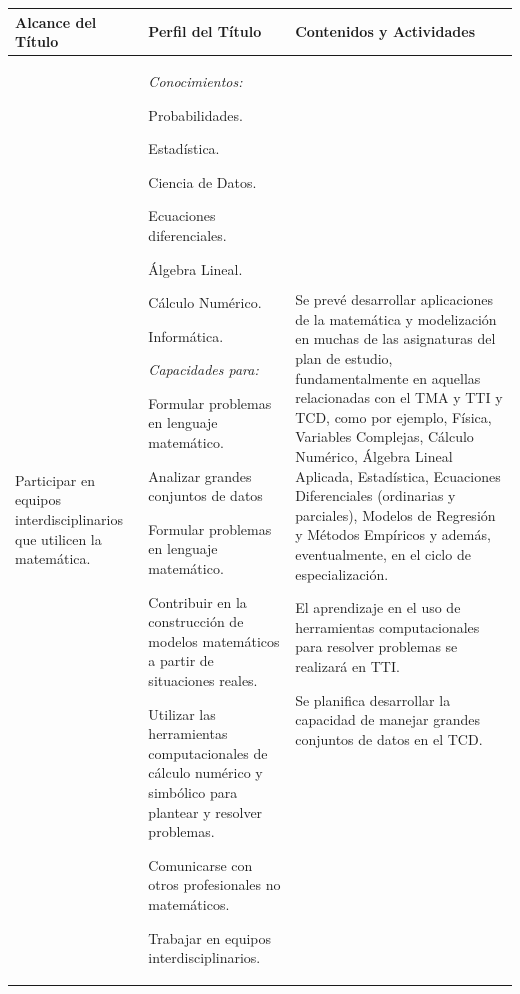 \documentclass[a4paper, 12pt]{article}
\begin{document}
\begin{center}

\begin{tabularx}{1.0\textwidth}{|>{\raggedright\arraybackslash}X |
>{\raggedright\arraybackslash}X |
>{\raggedright\arraybackslash}X |
}\hline
  \rowcolor[gray]{.9}
  Alcance del Título
  & Perfil del Título
  & Contenidos y Actividades \\ \hline
Participar en equipos interdisciplinarios que utilicen la matemática.
  & \emph{Conocimientos:} 
  
 
 Probabilidades.
    
   Estadística.
   
   Ciencia de Datos.
   
   Ecuaciones diferenciales.
   
   Álgebra Lineal. 
   
   Cálculo Numérico. 
   
   Informática.
 
  
  \emph{Capacidades para:} 
    
 
   Formular problemas en lenguaje matemático.
   
    Analizar grandes conjuntos de datos
    
   Formular problemas en lenguaje matemático.
   
   Contribuir en la construcción de modelos matemáticos a partir de situaciones reales.
   
    Utilizar las herramientas computacionales de cálculo numérico y simbólico para plantear y resolver problemas.
    
   Comunicarse con otros profesionales no matemáticos.
   
   Trabajar en equipos interdisciplinarios.
 
  
  
  &

  
 Se prevé desarrollar aplicaciones de la matemática y modelización en muchas de las asignaturas del plan de estudio, fundamentalmente en aquellas relacionadas con el TMA y TTI y TCD, como por ejemplo,  Física, Variables Complejas, Cálculo Numérico, Álgebra Lineal Aplicada, Estadística, Ecuaciones Diferenciales (ordinarias y parciales), Modelos de Regresión y Métodos Empíricos y además, eventualmente, en el ciclo de especialización.
  
  El aprendizaje en el uso de herramientas computacionales para resolver problemas se realizará en  TTI.
  
  Se planifica desarrollar la capacidad de manejar grandes conjuntos de datos en el TCD.



\end{tabularx}
\end{center}
\end{document}
